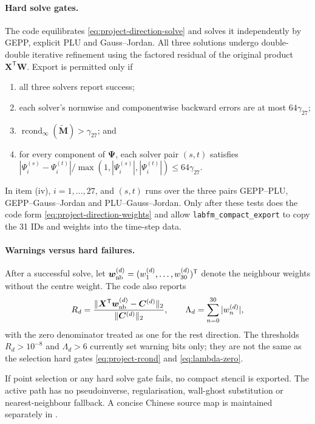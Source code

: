 \documentclass[11pt,a4paper]{article}
\begin{document}
\paragraph{Hard solve gates.}
The code equilibrates \eqref{eq:project-direction-solve} and solves it independently by
GEPP, explicit PLU and Gauss--Jordan. All three solutions undergo double-double iterative
refinement using the factored residual of the original product
$\bm X^{\mathsf T}\bm W$. Export is permitted only if
\begin{enumerate}[label=(\roman*),leftmargin=2.0em]
\item all three solvers report success;
\item each solver's normwise and componentwise backward errors are at most
      $64\gamma_{27}$;
\item $\operatorname{rcond}_{\infty}(\widetilde{\bm M})>\gamma_{27}$; and
\item for every component of $\bm\Psi$, each solver pair $(s,t)$ satisfies
      $|\Psi_i^{(s)}-\Psi_i^{(t)}|/
       \max(1,|\Psi_i^{(s)}|,|\Psi_i^{(t)}|)\le64\gamma_{27}$.
\end{enumerate}
In item (iv), $i=1,\ldots,27$, and $(s,t)$ runs over the three pairs
GEPP--PLU, GEPP--Gauss--Jordan and PLU--Gauss--Jordan.
Only after these tests does the code form \eqref{eq:project-direction-weights} and allow
\texttt{labfm\_compact\_export} to copy the 31 IDs and weights into the time-step data.

\paragraph{Warnings versus hard failures.}
After a successful solve, let
$\bm w_{\rm nb}^{(d)}=(w_1^{(d)},\ldots,w_{30}^{(d)})^{\mathsf T}$ denote the neighbour
weights without the centre weight. The code also reports
\begin{equation}
 R_d=
 \frac{\|\bm X^{\mathsf T}\bm w_{\rm nb}^{(d)}-\bm C^{(d)}\|_2}
      {\|\bm C^{(d)}\|_2},
 \qquad
 \Lambda_d=\sum_{n=0}^{30}|w_n^{(d)}|,
\label{eq:project-direction-diagnostics}
\end{equation}
with the zero denominator treated as one for the rest direction. The thresholds
$R_d>10^{-8}$ and $\Lambda_d>6$ currently set warning bits only; they are not the same as
the selection hard gates \eqref{eq:project-rcond} and \eqref{eq:lambda-zero}.

If point selection or any hard solve gate fails, no compact stencil is exported. The
active path has no pseudoinverse, regularisation, wall-ghost substitution or
nearest-neighbour fallback. A concise Chinese source map is maintained separately in
.
\end{document}
